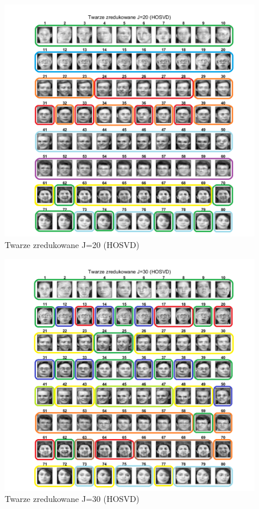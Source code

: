 \documentclass[11pt, a4paper]{article}
\begin{document}
\begin{figure}[H]
	\centering
	\includegraphics[width=1\textwidth]{./assets/rezultat_HOSVD_j20.png}
	\caption{Twarze zredukowane J=20 (HOSVD)}
	\label{fig:rezultat_HOSVD_j20}
\end{figure}

\begin{figure}[H]
	\centering
	\includegraphics[width=1\textwidth]{./assets/rezultat_HOSVD_j30.png}
	\caption{Twarze zredukowane J=30 (HOSVD)}
	\label{fig:rezultat_HOSVD_j30}
\end{figure}
\end{document}
